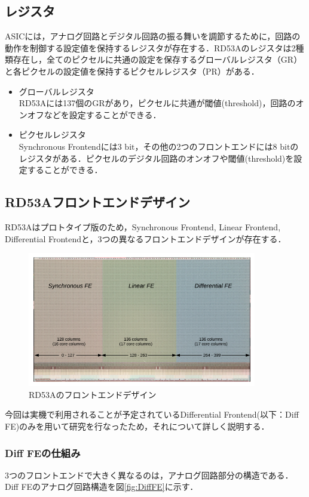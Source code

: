 \subsection{レジスタ}
ASICには，アナログ回路とデジタル回路の振る舞いを調節するために，回路の動作を制御する設定値を保持するレジスタが存在する．RD53Aのレジスタは2種類存在し，全てのピクセルに共通の設定を保存するグローバルレジスタ（GR）と各ピクセルの設定値を保持するピクセルレジスタ（PR）がある．
\begin{itemize}
\item グローバルレジスタ\\
  RD53Aには137個のGRがあり，ピクセルに共通が閾値(threshold)，回路のオンオフなどを設定することができる．
\item ピクセルレジスタ\\
  Synchronous Frontendには3 $\mathrm{bit}$，その他の2つのフロントエンドには8 $\mathrm{bit}$のレジスタがある．ピクセルのデジタル回路のオンオフや閾値(threshold)を設定することができる．
\end{itemize}


\subsection{RD53Aフロントエンドデザイン}
RD53Aはプロトタイプ版のため，Synchronous Frontend, Linear Frontend, Differential Frontendと，3つの異なるフロントエンドデザインが存在する．

\begin{figure}[h]
\centering
\includegraphics[width=10cm]{./figure/RD53A_FE.png}
\caption{RD53Aのフロントエンドデザイン\cite{Garcia-Sciveres:2287593}}
\label{fig:RD53AFE}
\end{figure}

今回は実機で利用されることが予定されているDifferential Frontend(以下：Diff FE)のみを用いて研究を行なったため，それについて詳しく説明する．

\subsubsection*{Diff FEの仕組み}
3つのフロントエンドで大きく異なるのは，アナログ回路部分の構造である．Diff FEのアナログ回路構造を図\ref{fig:DiffFE}に示す．\par

